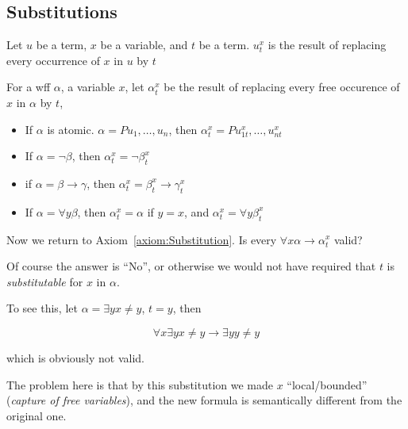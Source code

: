 \subsection{Substitutions}

\begin{definition}
    Let $u$ be a term, $x$ be a variable, and $t$ be a term. $u_t^x$ is the result of replacing every occurrence of $x$ in $u$ by $t$
\end{definition}

\begin{definition}
    For a wff $\alpha$, a variable $x$, let $\alpha_t^x$ be the result of replacing every free occurence of $x$ in $\alpha$ by $t$,

    \begin{itemize}
        \item If $\alpha$ is atomic. $\alpha = Pu_1,\dots,u_n$, then $\alpha_t^x = Pu_{1t}^x,\dots,u_{nt}^x$
        \item If $\alpha = \neg \beta$, then $\alpha_t^x = \neg\beta_t^x$
        \item if $\alpha = \beta\to\gamma$, then $\alpha_t^x = \beta_t^x \to \gamma_t^x$
        \item If $\alpha = \forall y \beta$, then $\alpha_t^x = \alpha$ if $y=x$, and $\alpha_t^x = \forall y \beta_t^x$
    \end{itemize}
\end{definition}

Now we return to Axiom~\ref{axiom:Substitution}. Is every $\forall x \alpha \to \alpha_t^x$ valid?

Of course the answer is ``No'', or otherwise we would not have required that $t$ is \emph{substitutable} for $x$ in $\alpha$.

To see this, let $\alpha = \exists y x\neq y$, $t=y$, then

\[ \forall x \exists y x\neq y \to \exists y y\neq y \]

which is obviously not valid.

The problem here is that by this substitution we made $x$ ``local/bounded'' (\emph{capture of free variables}), and the new formula is semantically different from the original one.

